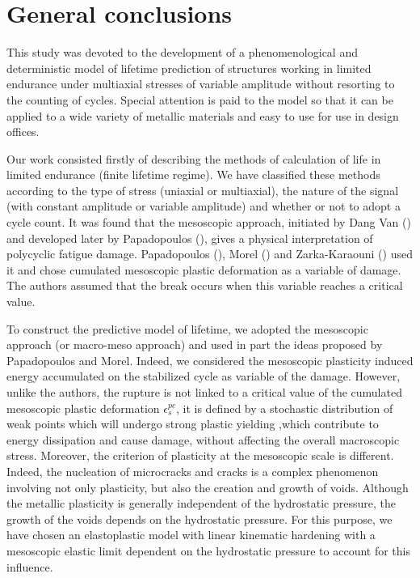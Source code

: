 \chapter{General conclusions}\label{chp:8}
\minitoc
This study was devoted to the development of a phenomenological and deterministic model of lifetime prediction of structures working in limited endurance under multiaxial stresses of variable amplitude without resorting to the counting of cycles. Special attention is paid to the model so that it can be applied to a wide variety of metallic materials and easy to use for use in design offices.

Our work consisted firstly of describing the methods of calculation of life in limited endurance (finite lifetime regime). We have classified these methods according to the type of stress (uniaxial or multiaxial), the nature of the signal (with constant amplitude or variable amplitude) and whether or not to adopt a cycle count. It was found that the mesoscopic approach, initiated by Dang Van (\cite{van1986criterion}) and developed later by Papadopoulos (\cite{papadopoulos2001long}), gives a physical interpretation of polycyclic fatigue damage. Papadopoulos (\cite{papadopoulos2001long}), Morel (\cite{FFE:FFE452}) and Zarka-Karaouni (\cite{de2013comportement}) used it and chose cumulated mesoscopic plastic deformation as a variable of damage. The authors assumed that the break occurs when this variable reaches a critical value.

To construct the predictive model of lifetime, we adopted the mesoscopic approach (or macro-meso approach) and used in part the ideas proposed by Papadopoulos and Morel. Indeed, we considered the mesoscopic plasticity induced energy accumulated on the stabilized cycle as variable of the damage. However, unlike the authors, the rupture is not linked to a critical value of the cumulated mesoscopic plastic deformation $\epsilon^{pc}_s$, it is defined by a stochastic distribution of weak points which will undergo strong plastic yielding ,which contribute to energy dissipation and cause
damage, without affecting the overall macroscopic stress. Moreover, the criterion of plasticity at the mesoscopic scale is different. Indeed, the nucleation of microcracks and cracks is a complex phenomenon involving not only plasticity, but also the creation and growth of voids. Although the metallic plasticity is generally independent of the hydrostatic pressure, the growth of the voids depends on the hydrostatic pressure. For this purpose, we have chosen an elastoplastic model with linear kinematic hardening with a mesoscopic elastic limit dependent on the hydrostatic pressure to account for this influence.

